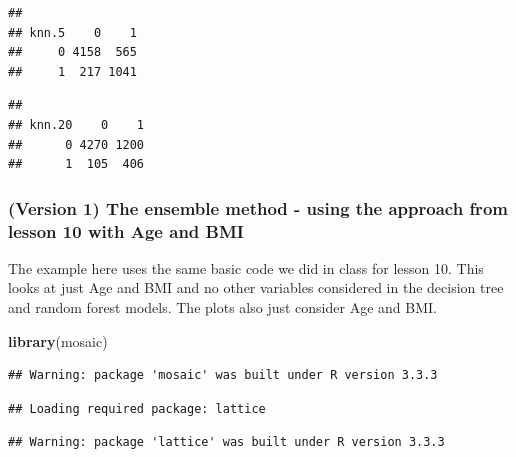 \documentclass[]{article}
\newenvironment{Shaded}{\begin{snugshade}}{\end{snugshade}}
\newcommand{\KeywordTok}[1]{\textcolor[rgb]{0.13,0.29,0.53}{\textbf{{#1}}}}
\newcommand{\FloatTok}[1]{\textcolor[rgb]{0.00,0.00,0.81}{{#1}}}
\newcommand{\NormalTok}[1]{{#1}}
\begin{document}
\begin{Shaded}
\end{Shaded}

\begin{verbatim}
##      
## knn.5    0    1
##     0 4158  565
##     1  217 1041
\end{verbatim}

\begin{Shaded}
\end{Shaded}

\begin{verbatim}
##       
## knn.20    0    1
##      0 4270 1200
##      1  105  406
\end{verbatim}

\subsubsection{(Version 1) The ensemble method - using the approach from
lesson 10 with Age and
BMI}\label{version-1-the-ensemble-method---using-the-approach-from-lesson-10-with-age-and-bmi}

The example here uses the same basic code we did in class for lesson 10.
This looks at just Age and BMI and no other variables considered in the
decision tree and random forest models. The plots also just consider Age
and BMI.

\begin{Shaded}
\begin{Highlighting}[]
\KeywordTok{library}\NormalTok{(mosaic)}
\end{Highlighting}
\end{Shaded}

\begin{verbatim}
## Warning: package 'mosaic' was built under R version 3.3.3
\end{verbatim}

\begin{verbatim}
## Loading required package: lattice
\end{verbatim}

\begin{verbatim}
## Warning: package 'lattice' was built under R version 3.3.3
\end{verbatim}
\end{document}
